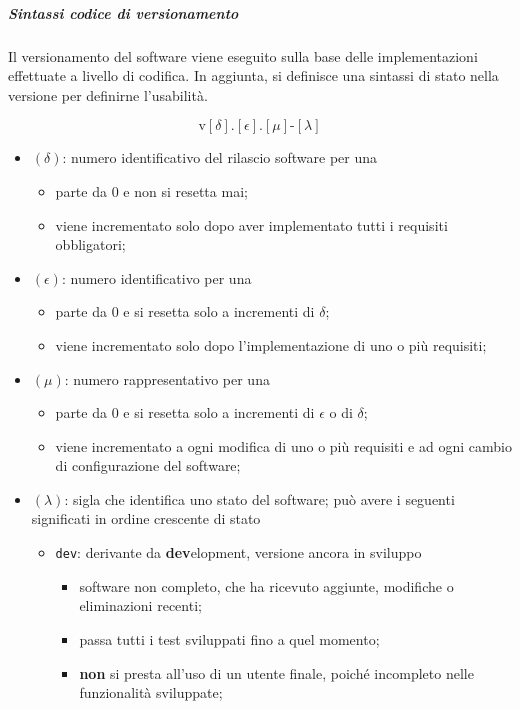 		\subparagraph{Sintassi codice di versionamento}

		Il versionamento del software viene eseguito sulla base delle implementazioni effettuate a livello di codifica.
		In aggiunta, si definisce una sintassi di stato nella versione per definirne l'usabilità.

		\[%
			\text{v}[\delta].[\epsilon].[\mu]\text{-}[\lambda]
		\]

		\begin{itemize}
			\item \((\delta)\): numero identificativo del rilascio software per una 
			\begin{itemize}
				\item parte da 0 e non si resetta mai;
				\item viene incrementato solo dopo aver implementato tutti i requisiti obbligatori;
			\end{itemize}
			\item \((\epsilon)\): numero identificativo per una 
			\begin{itemize}
				\item parte da 0 e si resetta solo a incrementi di \(\delta\);
				\item viene incrementato solo dopo l'implementazione di uno o più requisiti;
			\end{itemize}
			\item \((\mu)\): numero rappresentativo per una 
			\begin{itemize}
				\item parte da 0 e si resetta solo a incrementi di \(\epsilon\) o di \(\delta\);
				\item viene incrementato a ogni modifica di uno o più requisiti e ad ogni cambio di configurazione del software;
			\end{itemize}
			\item \((\lambda)\): sigla che identifica uno stato del software; può avere i seguenti significati in ordine crescente di stato
			\begin{itemize}
				\item \verb!dev!: derivante da \textbf{dev}elopment, versione ancora in sviluppo
					\begin{itemize}
						\item software non completo, che ha ricevuto aggiunte, modifiche o eliminazioni recenti;
						\item passa tutti i test sviluppati fino a quel momento;
						\item \textbf{non} si presta all'uso di un utente finale, poiché incompleto nelle funzionalità sviluppate;

\end{itemize}
\end{itemize}
\end{itemize}

